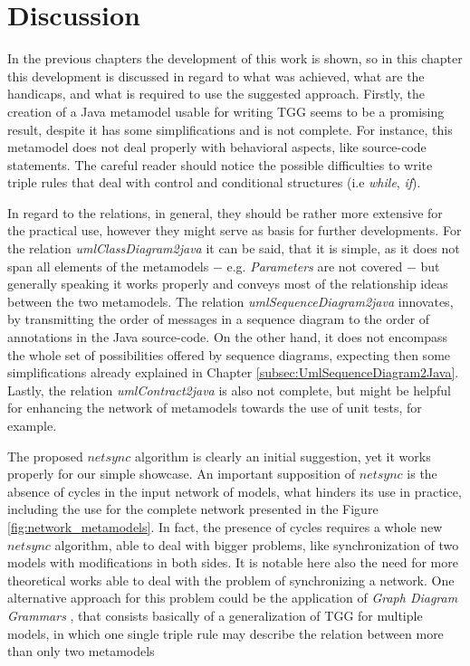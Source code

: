 \documentclass[tuberlin,cic,tc,english,noabntcite]{iiufrgs}
\begin{document}
\chapter{Discussion}
\label{chapter:discussion}

In the previous chapters the development of this work is shown, so in this chapter this development is discussed in regard to what was achieved, what are the handicaps, and what is required to use the suggested approach. Firstly, the creation of a Java metamodel usable for writing TGG seems to be a promising result, despite it has some simplifications and is not complete. For instance, this metamodel does not deal properly with behavioral aspects, like source-code statements. The careful reader should notice the possible difficulties to write triple rules that deal with control and conditional structures (i.e \emph{while}, \emph{if}).

In regard to the relations, in general, they should be rather more extensive for the practical use, however they might serve as basis for further developments. For the relation \emph{umlClassDiagram2java} it can be said, that it is simple, as it does not span all elements of the metamodels $-$ e.g. \emph{Parameters} are not covered $-$ but generally speaking it works properly and conveys most of the relationship ideas between the two metamodels. The relation \emph{umlSequenceDiagram2java} innovates, by transmitting the order of messages in a sequence diagram to the order of annotations in the Java source-code. On the other hand, it does not encompass the whole set of possibilities offered by sequence diagrams, expecting then some simplifications already explained in Chapter \ref{subsec:UmlSequenceDiagram2Java}. Lastly, the relation \emph{umlContract2java} is also not complete, but might be helpful for enhancing the network of metamodels towards the use of unit tests, for example.

The proposed $netsync$ algorithm is clearly an initial suggestion, yet it works properly for our simple showcase. An important supposition of $netsync$ is the absence of cycles in the input network of models, what hinders its use in practice, including the use for the complete network presented in the Figure \ref{fig:network_metamodels}. In fact, the presence of cycles requires a whole new $netsync$ algorithm, able to deal with bigger problems, like synchronization of two models with modifications in both sides. It is notable here also the need for more theoretical works able to deal with the problem of synchronizing a network. One alternative approach for this problem could be the application of \emph{Graph Diagram Grammars} \citep{trollmann2015extending}, that consists basically of a generalization of TGG for multiple models, in which one single triple rule may describe the relation between more than only two metamodels
\end{document}
